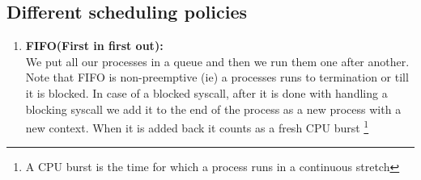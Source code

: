 \documentclass[12pt]{article}
\begin{document}
\subsection{Different scheduling policies}
\begin{enumerate}
    

    \item \textbf{FIFO(First in first out):}\\
    We put all our processes in a queue and then we run them one after another.
    Note that FIFO is non-preemptive (ie) a processes runs to termination or till it is blocked. In case of a blocked syscall, after it is done with handling
    a blocking syscall we add it to the end of the process as a new process with a new context. When it is added back it counts as a fresh CPU burst
    \footnote{A CPU burst is the time for which a process runs in a continuous stretch}


\end{enumerate}
\end{document}
